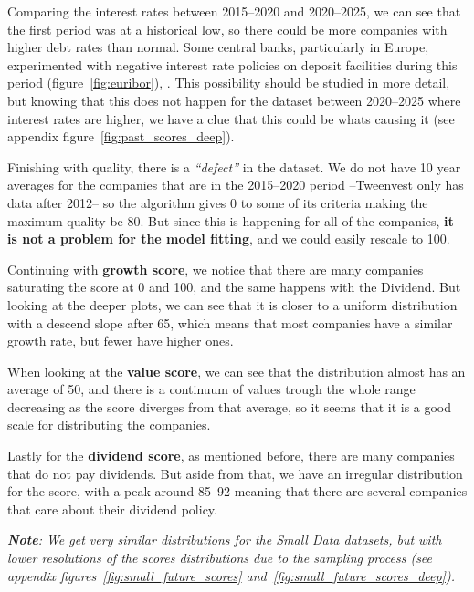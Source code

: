 \documentclass[11pt,english,a4paper,hidelinks]{book}
\begin{document}
\noindent Comparing the interest rates between 2015--2020 and 2020--2025, we can see that the first period was at a historical low, so there could be more companies with higher debt rates than normal. Some central banks, particularly in Europe, experimented with negative interest rate policies on deposit facilities during this period (figure~\ref{fig:euribor}), \cite{euribor_emmi}. This possibility should be studied in more detail, but knowing that this does not happen for the dataset between 2020--2025 where interest rates are higher, we have a clue that this could be whats causing it (see appendix figure~\ref{fig:past_scores_deep}).

\vspace{0.5cm}
\noindent Finishing with quality, there is a \textit{``defect''} in the dataset. We do not have 10 year averages for the companies that are in the 2015--2020 period --Tweenvest only has data after 2012-- so the algorithm gives 0 to some of its criteria making the maximum quality be 80. But since this is happening for all of the companies, \textbf{it is not a problem for the model fitting}, and we could easily rescale to 100.

\vspace{0.5cm}
\noindent Continuing with \textbf{growth score}, we notice that there are many companies saturating the score at 0 and 100, and the same happens with the Dividend. But looking at the deeper plots, we can see that it is closer to a uniform distribution with a descend slope after 65, which means that most companies have a similar growth rate, but fewer have higher ones.

\vspace{0.5cm}
\noindent When looking at the \textbf{value score}, we can see that the distribution almost has an average of 50, and there is a continuum of values trough the whole range decreasing as the score diverges from that average, so it seems that it is a good scale for distributing the companies.

\vspace{0.5cm}
\noindent Lastly for the \textbf{dividend score}, as mentioned before, there are many companies that do not pay dividends. But aside from that, we have an irregular distribution for the score, with a peak around 85--92 meaning that there are several companies that care about their dividend policy.

\vspace{0.5cm}
\noindent \textit{\textbf{Note}: We get very similar distributions for the Small Data datasets, but with lower resolutions of the scores distributions due to the sampling process (see appendix figures~\ref{fig:small_future_scores} and~\ref{fig:small_future_scores_deep}).}
\end{document}
